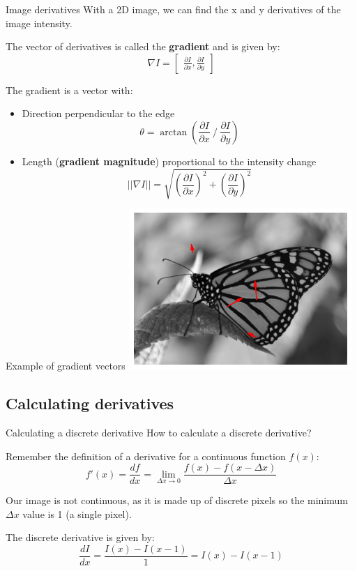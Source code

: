 \documentclass[9pt, aspectratio=169]{beamer}
\begin{document}
\begin{frame}
    {Image derivatives}
    With a 2D image, we can find the x and y derivatives of the image intensity.

    The vector of derivatives is called the \textbf{gradient} and is given by:
    \Large
    $$\nabla I = \begin{bmatrix}\frac{\partial I}{\partial x}, \frac{\partial I}{\partial y}\end{bmatrix}$$

    \normalsize

    The gradient is a vector with:
    \begin{itemize}
        \item Direction perpendicular to the edge
              $$\theta = \arctan\left(\frac{\partial I}{\partial x} \mathbin{/} \frac{\partial I}{\partial y}\right)$$
              \pause
        \item Length (\textbf{gradient magnitude}) proportional to the intensity change
              $$\lvert\lvert\nabla I\rvert\rvert = \sqrt{\left(\frac{\partial I}{\partial x}\right)^2 + \left(\frac{\partial I}{\partial y}\right)^2}$$
    \end{itemize}
\end{frame}

\begin{frame}
    {Example of gradient vectors}
    \centering
    \includegraphics[width=.7\textwidth]{monarch_gradient.png}
\end{frame}

\subsection {Calculating derivatives}

\begin{frame}
    {Calculating a discrete derivative}
    How to calculate a discrete derivative?

    Remember the definition of a derivative for a continuous function $f(x)$:
    $$f'(x) = \frac{df}{dx} = \lim_{\Delta x \rightarrow 0} \frac{f(x) - f(x - \Delta x)}{\Delta x}$$

    \pause
    Our image is not continuous, as it is made up of discrete pixels so the minimum $\Delta x$ value is 1 (a single pixel).

    \pause
    The discrete derivative is given by:
    $$\frac{dI}{dx} = \frac{I(x) - I(x-1)}{1} = I(x) - I(x-1)$$
\end{frame}
\end{document}
